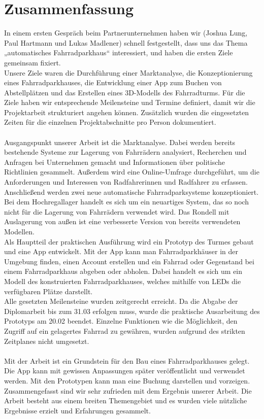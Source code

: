 \section{Zusammenfassung}

In einem ersten Gespräch beim Partnerunternehmen haben wir (Joshua Lung, Paul Hartmann und Lukas Madlener) schnell festgestellt, dass uns das Thema „automatisches Fahrradparkhaus“ interessiert, und haben die ersten Ziele gemeinsam fixiert. \\
Unsere Ziele waren die Durchführung einer Marktanalyse, die Konzeptionierung eines Fahrradparkhauses, die Entwicklung einer App zum Buchen von Abstellplätzen und das Erstellen eines 3D-Modells des Fahrradturms. Für die Ziele haben wir entsprechende Meilensteine und Termine definiert, damit wir die Projektarbeit strukturiert angehen können. Zusätzlich wurden die eingesetzten Zeiten für die einzelnen Projektabschnitte pro Person dokumentiert.\\ \\
Ausgangspunkt unserer Arbeit ist die Marktanalyse. Dabei werden bereits bestehende Systeme zur Lagerung von Fahrrädern analysiert, Recherchen und Anfragen bei Unternehmen gemacht und Informationen über politische Richtlinien gesammelt. Außerdem wird eine Online-Umfrage durchgeführt, um die Anforderungen und Interessen von Radfahrerinnen und Radfahrer zu erfassen.\\
Anschließend werden zwei neue automatische Fahrradparksysteme konzeptioniert. Bei dem Hochregallager handelt es sich um ein neuartiges System, das so noch nicht für die Lagerung von Fahrrädern verwendet wird. Das Rondell mit Auslagerung von außen ist eine verbesserte Version von bereits verwendeten Modellen.\\
Als Hauptteil der praktischen Ausführung wird ein Prototyp des Turmes gebaut und eine App entwickelt. Mit der App kann man Fahrradparkhäuser in der Umgebung finden, einen Account erstellen und ein Fahrrad oder Gegenstand bei einem Fahrradparkhaus abgeben oder abholen. Dabei handelt es sich um ein Modell des konstruierten Fahrradparkhauses, welches mithilfe von LEDs die verfügbaren Plätze darstellt. \\
Alle gesetzten Meilensteine wurden zeitgerecht erreicht. Da die Abgabe der Diplomarbeit bis zum 31.03 erfolgen muss, wurde die praktische Ausarbeitung des Prototyps am 20.02 beendet. Einzelne Funktionen wie die Möglichkeit, den Zugriff auf ein gelagertes Fahrrad zu gewähren, wurden aufgrund des strikten Zeitplanes nicht umgesetzt.\\ \\

Mit der Arbeit ist ein Grundstein für den Bau eines Fahrradparkhauses gelegt. Die App kann mit gewissen Anpassungen später veröffentlicht und verwendet werden. Mit den Prototypen kann man eine Buchung darstellen und vorzeigen.\\
Zusammengefasst sind wir sehr zufrieden mit dem Ergebnis unserer Arbeit. Die Arbeit besteht aus einem breiten Themengebiet und es wurden viele nützliche Ergebnisse erzielt und Erfahrungen gesammelt.\\

